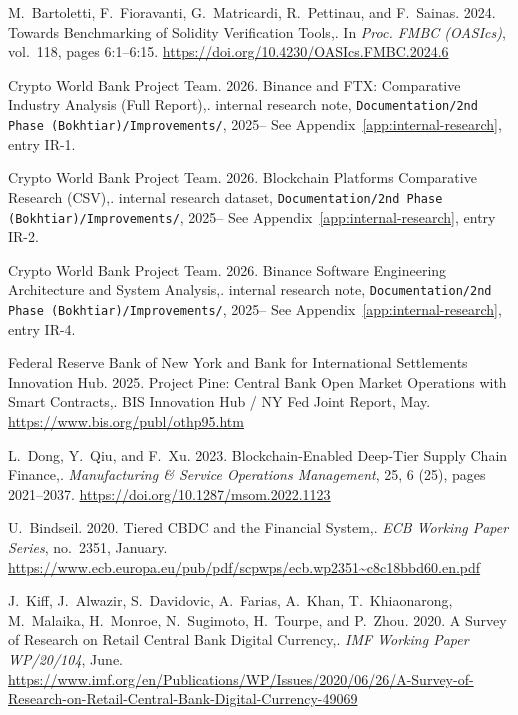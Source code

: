 {\begin{enumerate}[label={[\arabic*]}]
\item M.~Bartoletti, F.~Fioravanti, G.~Matricardi, R.~Pettinau, and F.~Sainas. 2024. Towards Benchmarking of Solidity Verification Tools,. In \emph{Proc. FMBC (OASIcs)}, vol.~118, pages 6:1--6:15. \url{https://doi.org/10.4230/OASIcs.FMBC.2024.6}

\item Crypto World Bank Project Team. 2026. Binance and FTX: Comparative Industry Analysis (Full Report),. internal research note, \texttt{Documentation/2nd Phase (Bokhtiar)/Improvements/}, 2025-- See Appendix~\ref{app:internal-research}, entry IR-1.

\item Crypto World Bank Project Team. 2026. Blockchain Platforms Comparative Research (CSV),. internal research dataset, \texttt{Documentation/2nd Phase (Bokhtiar)/Improvements/}, 2025-- See Appendix~\ref{app:internal-research}, entry IR-2.

\item Crypto World Bank Project Team. 2026. Binance Software Engineering Architecture and System Analysis,. internal research note, \texttt{Documentation/2nd Phase (Bokhtiar)/Improvements/}, 2025-- See Appendix~\ref{app:internal-research}, entry IR-4.

\item Federal Reserve Bank of New York and Bank for International Settlements Innovation Hub. 2025. Project Pine: Central Bank Open Market Operations with Smart Contracts,. BIS Innovation Hub / NY Fed Joint Report, May. \url{https://www.bis.org/publ/othp95.htm}

\item L.~Dong, Y.~Qiu, and F.~Xu. 2023. Blockchain-Enabled Deep-Tier Supply Chain Finance,. \emph{Manufacturing \& Service Operations Management}, 25, 6 (25), pages 2021--2037. \url{https://doi.org/10.1287/msom.2022.1123}

\item U.~Bindseil. 2020. Tiered CBDC and the Financial System,. \emph{ECB Working Paper Series}, no.~2351, January. \url{https://www.ecb.europa.eu/pub/pdf/scpwps/ecb.wp2351~c8c18bbd60.en.pdf}

\item J.~Kiff, J.~Alwazir, S.~Davidovic, A.~Farias, A.~Khan, T.~Khiaonarong, M.~Malaika, H.~Monroe, N.~Sugimoto, H.~Tourpe, and P.~Zhou. 2020. A Survey of Research on Retail Central Bank Digital Currency,. \emph{IMF Working Paper WP/20/104}, June. \url{https://www.imf.org/en/Publications/WP/Issues/2020/06/26/A-Survey-of-Research-on-Retail-Central-Bank-Digital-Currency-49069}


\end{enumerate}}

